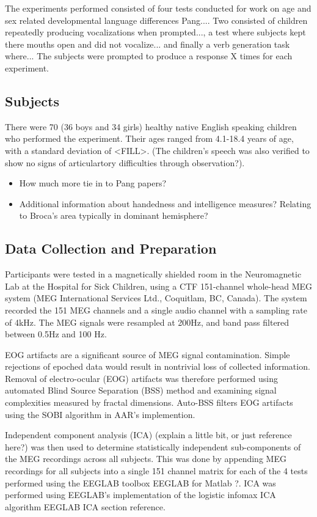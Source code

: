 \documentclass[a4paper]{article}
\begin{document}
The experiments performed consisted of four tests conducted for work on age and sex related developmental language differences {Pang...}. Two consisted of children repeatedly producing vocalizations when prompted..., a test where subjects kept there mouths open and did not vocalize... and finally a verb generation task where... The subjects were prompted to produce a response X times for each experiment.

\subsection{Subjects}

There were 70 (36 boys and 34 girls) healthy native English speaking children who performed the experiment. Their ages ranged from 4.1-18.4 years of age, with a standard deviation of <FILL>. (The children's speech was also verified to show no signs of articulartory difficulties through observation?).

\begin{itemize}
\item How much more tie in to Pang papers?
\item Additional information about handedness and intelligence measures? Relating to Broca's area typically in dominant hemisphere?
\end{itemize}

\subsection{Data Collection and Preparation}

Participants were tested in a magnetically shielded room in the Neuromagnetic Lab at the Hospital for Sick Children, using a CTF 151-channel whole-head MEG system (MEG International Services Ltd., Coquitlam, BC, Canada). The system recorded the 151 MEG channels and a single audio channel with a sampling rate of 4kHz. The MEG signals were resampled at 200Hz, and band pass filtered between 0.5Hz and 100 Hz.

EOG artifacts are a significant source of MEG signal contamination. Simple rejections of epoched data would result in nontrivial loss of collected information. Removal of electro-ocular (EOG) artifacts was therefore performed using automated Blind Source Separation (BSS) method and examining signal complexities measured by fractal dimensions. Auto-BSS filters EOG artifacts using the SOBI algorithm in AAR's implemention.

Independent component analysis (ICA) (explain a little bit, or just reference here?) was then used to determine statistically independent sub-components of the MEG recordings across all subjects. This was done by appending MEG recordings for all subjects into a single 151 channel matrix for each of the 4 tests performed using the EEGLAB toolbox {EEGLAB} for Matlab {?}. ICA was performed using EEGLAB's implementation of the logistic infomax ICA algorithm {EEGLAB ICA section reference}.
\end{document}
